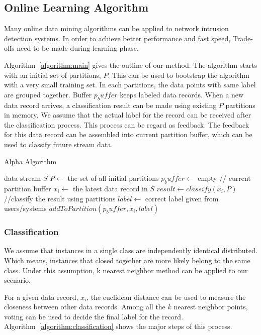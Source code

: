 \documentclass[runningheads]{llncs}
\begin{document}
	\subsection{Online Learning Algorithm}
	Many online data mining algorithms can be applied to network intrusion detection systems. In order to achieve better performance and fast speed, Trade-offs need to be made during learning phase.
	
	Algorithm~\ref{algorithm:main} gives the outline of our method. The algorithm starts with an initial set of partitions, $P$. This can be used to bootstrap the algorithm with a very small training set. In each partitions, the data points with same label are grouped together. Buffer $p_buffer$ keeps labeled data records. When a new data record arrives, a classification result can be made using existing $P$ partitions in memory. We assume that the actual label for the record can be received after the classification process. This process can be regard as feedback. The feedback for this data record can be assembled into current partition buffer, which can be used to classify future stream data.
	
	\begin{algorithm}
		\caption{Alpha Algorithm} \label{algorithm:main}
		\begin{algorithmic}
			\REQUIRE data stream $S$
			\STATE $P \gets$ the set of all initial partitions
			\STATE $p_buffer \gets$ empty // current partition buffer
			\STATE $x_i \gets $ the latest data record in $S$
			\STATE $result \gets classify(x_i, P)$ //classify the result using partitions
			\STATE $label \gets$ correct label given from users/systems
			\STATE $addToPartition(p_buffer, x_i, label)$ 
			\ENDWHILE
		\end{algorithmic}
	\end{algorithm}
	
	\subsubsection{Classification}
	
	We assume that instances in a single class are independently identical distributed. Which means, instances that closed together are more likely belong to the same class. Under this assumption, k nearest neighbor method can be applied to our scenario.
	
	For a given data record, $x_i$, the euclidean distance can be used to measure the closeness between other data records. Among all the $k$ nearest neighbor points, voting can be used to decide the final label for the record. Algorithm~\ref{algorithm:classification} shows the major steps of this process.
	
\end{document}
